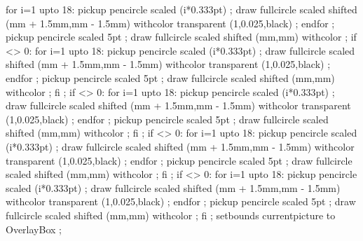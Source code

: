 for i=1 upto 18:
 	pickup pencircle scaled (i*0.333pt) ;
 	draw fullcircle scaled  shifted (mm + 1.5mm,mm - 1.5mm) withcolor transparent (1,0.025,black) ;
 endfor ;
pickup pencircle scaled 5pt ;
draw fullcircle scaled  shifted (mm,mm) withcolor  ;
if  <> 0:
	for i=1 upto 18:
 		pickup pencircle scaled (i*0.333pt) ;
 		draw fullcircle scaled  shifted (mm + 1.5mm,mm - 1.5mm) withcolor transparent (1,0.025,black) ;
	 endfor ;
	pickup pencircle scaled 5pt ;
	draw fullcircle scaled  shifted (mm,mm) withcolor  ;
fi ;
if  <> 0:
	for i=1 upto 18:
 		pickup pencircle scaled (i*0.333pt) ;
 		draw fullcircle scaled  shifted (mm + 1.5mm,mm - 1.5mm) withcolor transparent (1,0.025,black) ;
	 endfor ;
	pickup pencircle scaled 5pt ;
	draw fullcircle scaled  shifted (mm,mm) withcolor  ;
fi ;
if  <> 0:
	for i=1 upto 18:
 		pickup pencircle scaled (i*0.333pt) ;
 		draw fullcircle scaled  shifted (mm + 1.5mm,mm - 1.5mm) withcolor transparent (1,0.025,black) ;
	 endfor ;
	pickup pencircle scaled 5pt ;
	draw fullcircle scaled  shifted (mm,mm) withcolor  ;
fi ;
if  <> 0:
	for i=1 upto 18:
 		pickup pencircle scaled (i*0.333pt) ;
 		draw fullcircle scaled  shifted (mm + 1.5mm,mm - 1.5mm) withcolor transparent (1,0.025,black) ;
	 endfor ;
	pickup pencircle scaled 5pt ;
	draw fullcircle scaled  shifted (mm,mm) withcolor  ;
fi ;
setbounds currentpicture to OverlayBox ;
\stopuseMPgraphic

